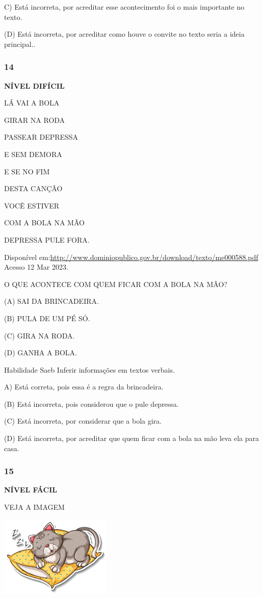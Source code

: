 C) Está incorreta, por acreditar esse acontecimento foi o mais
importante no texto.

(D) Está incorreta, por acreditar como houve o convite no texto seria a
ideia principal..

\subsubsection{14}\label{section-124}

\textbf{NÍVEL DIFÍCIL}

LÁ VAI A BOLA

GIRAR NA RODA

PASSEAR DEPRESSA

E SEM DEMORA

E SE NO FIM

DESTA CANÇÃO

VOCÊ ESTIVER

COM A BOLA NA MÃO

DEPRESSA PULE FORA.

Disponível
em:\url{http://www.dominiopublico.gov.br/download/texto/me000588.pdf}
Acesso 12 Mar 2023.

O QUE ACONTECE COM QUEM FICAR COM A BOLA NA MÃO?

(A) SAI DA BRINCADEIRA.

(B) PULA DE UM PÉ SÓ.

(C) GIRA NA RODA.

(D) GANHA A BOLA.

Habilidade Saeb Inferir informações em textos verbais.

A) Está correta, pois essa é a regra da brincadeira.

(B) Está incorreta, pois considerou que o pule depressa.

(C) Está incorreta, por considerar que a bola gira.

(D) Está incorreta, por acreditar que quem ficar com a bola na mão leva
ela para casa.

\subsubsection{15}\label{section-125}

\textbf{NÍVEL FÁCIL}

VEJA A IMAGEM

\includegraphics[width=2.09091in,height=1.52916in]{media/image161.jpeg}

